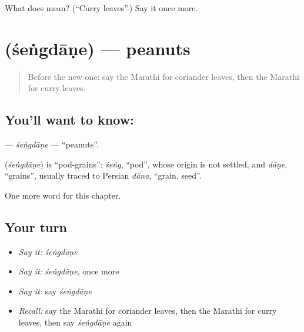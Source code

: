 \begin{tcolorbox}[breakable,colback=teal!4,colframe=teal!35!black,title={Before you move on}]
What does  mean? (\textquotedblleft{}Curry leaves\textquotedblright{}.) Say it once more.
\end{tcolorbox}
\section[\texorpdfstring{\mr{शेंगदाणे} (śeṅgdāṇe)}{शेंगदाणे (śeṅgdāṇe)}]{ (śeṅgdāṇe) — peanuts}

\label{lesson:MR-C244-sengdane}



\begin{quote}
Before the new one: say the Marathi for coriander leaves, then the Marathi for curry leaves.
\end{quote}

\subsection*{You'll want to know: }
\textbf{} — \emph{śeṅgdāṇe} — \textquotedblleft{}peanuts\textquotedblright{}.

\begin{cousinweb}
\textbf{} (\emph{śeṅgdāṇe}) is \textquotedblleft{}pod-grains\textquotedblright{}: \emph{śeṅg}, \textquotedblleft{}pod\textquotedblright{}, whose origin is not settled, and \emph{dāṇe}, \textquotedblleft{}grains\textquotedblright{}, usually traced to Persian \emph{dāna}, \textquotedblleft{}grain, seed\textquotedblright{}.
\end{cousinweb}

\begin{grammarlens}[title={What you've built}]
One more word for this chapter.
\end{grammarlens}

\subsection*{Your turn}
\begin{itemize}
\raggedright
  \item \emph{Say it:} \emph{śeṅgdāṇe}
  \item \emph{Say it:} \emph{śeṅgdāṇe}, once more
  \item \emph{Say it:} say \emph{śeṅgdāṇe}
  \item \emph{Recall:} say the Marathi for coriander leaves, then the Marathi for curry leaves, then say \emph{śeṅgdāṇe} again
\end{itemize}


